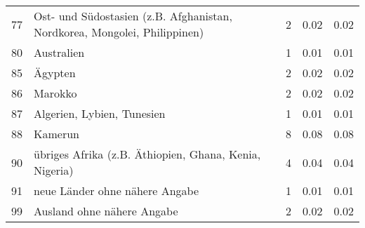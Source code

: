 \begin{longtable}{lXrrr}
        77 & \multicolumn{1}{X}{Ost- und Südostasien (z.B. Afghanistan, Nordkorea, Mongolei, Philippinen)} & %
          \num{2} &
          \num[round-mode=places,round-precision=2]{0.02} &
          \num[round-mode=places,round-precision=2]{0.02} \\

        80 & \multicolumn{1}{X}{Australien} & %
          \num{1} &
          \num[round-mode=places,round-precision=2]{0.01} &
          \num[round-mode=places,round-precision=2]{0.01} \\

        85 & \multicolumn{1}{X}{Ägypten} & %
          \num{2} &
          \num[round-mode=places,round-precision=2]{0.02} &
          \num[round-mode=places,round-precision=2]{0.02} \\

        86 & \multicolumn{1}{X}{Marokko} & %
          \num{2} &
          \num[round-mode=places,round-precision=2]{0.02} &
          \num[round-mode=places,round-precision=2]{0.02} \\

        87 & \multicolumn{1}{X}{Algerien, Lybien, Tunesien} & %
          \num{1} &
          \num[round-mode=places,round-precision=2]{0.01} &
          \num[round-mode=places,round-precision=2]{0.01} \\

        88 & \multicolumn{1}{X}{Kamerun} & %
          \num{8} &
          \num[round-mode=places,round-precision=2]{0.08} &
          \num[round-mode=places,round-precision=2]{0.08} \\

        90 & \multicolumn{1}{X}{übriges Afrika (z.B. Äthiopien, Ghana, Kenia, Nigeria)} & %
          \num{4} &
          \num[round-mode=places,round-precision=2]{0.04} &
          \num[round-mode=places,round-precision=2]{0.04} \\

        91 & \multicolumn{1}{X}{neue Länder ohne nähere Angabe} & %
          \num{1} &
          \num[round-mode=places,round-precision=2]{0.01} &
          \num[round-mode=places,round-precision=2]{0.01} \\

        99 & \multicolumn{1}{X}{Ausland ohne nähere Angabe} & %
          \num{2} &
          \num[round-mode=places,round-precision=2]{0.02} &
          \num[round-mode=places,round-precision=2]{0.02} \\


\end{longtable}
